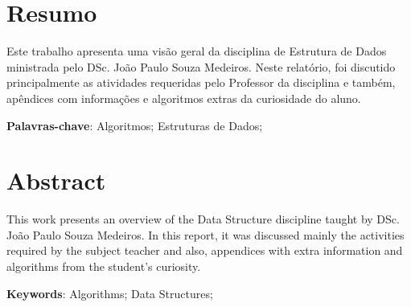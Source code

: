 
\chapter*{Resumo}
\thispagestyle{empty}

Este trabalho apresenta uma visão geral da disciplina de Estrutura de Dados
ministrada pelo DSc. João Paulo Souza Medeiros. Neste relatório, foi discutido
principalmente as atividades requeridas pelo Professor da disciplina e também,
apêndices com informações e algoritmos extras da curiosidade do aluno.

\vspace{1.5ex}

{\bf Palavras-chave}: 
Algoritmos;
Estruturas de Dados;


\chapter*{Abstract}
\thispagestyle{empty}

This work presents an overview of the Data Structure discipline
taught by DSc. João Paulo Souza Medeiros. In this report, it was discussed
mainly the activities required by the subject teacher and also,
appendices with extra information and algorithms from the student's curiosity.

\vspace{1.5ex}

{\bf Keywords}:
Algorithms;
Data Structures;

